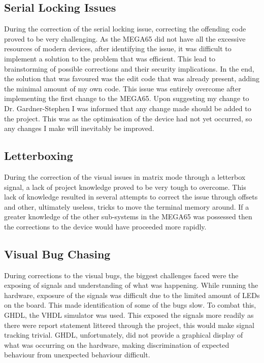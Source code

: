 \subsection{Serial Locking Issues}

\label{Ch7 Sec1 Sub2}

During the correction of the serial locking issue, correcting the offending code proved to be very challenging. As the MEGA65 did not have all the excessive resources of modern devices, after identifying the issue, it was difficult to implement a solution to the problem that was efficient. This lead to brainstorming of possible corrections and their security implications. In the end, the solution that was favoured was the edit code that was already present, adding the minimal amount of my own code. This issue was entirely overcome after implementing the first change to the MEGA65. Upon suggesting my change to Dr. Gardner-Stephen I was informed that any change made should be added to the project. This was as the optimisation of the device had not yet occurred, so any changes I make will inevitably be improved.  

\subsection{Letterboxing}

\label{Ch7 Sec1 Sub3}

During the correction of the visual issues in matrix mode through a letterbox signal, a lack of project knowledge proved to be very tough to overcome. This lack of knowledge resulted in several attempts to correct the issue through offsets and other, ultimately useless, tricks to move the terminal memory around. If a greater knowledge of the other sub-systems in the MEGA65 was possessed then the corrections to the device would have proceeded more rapidly.

\subsection{Visual Bug Chasing}

\label{Ch7 Sec1 Sub4}

During corrections to the visual bugs, the biggest challenges faced were the exposing of signals and understanding of what was happening. While running the hardware, exposure of the signals was difficult due to the limited amount of LEDs on the board. This made identification of some of the bugs slow. To combat this, GHDL, the VHDL simulator was used. This exposed the signals more readily as there were report statement littered through the project, this would make signal tracking trivial. GHDL, unfortunately, did not provide a graphical display of what was occurring on the hardware, making discrimination of expected behaviour from unexpected behaviour difficult.


